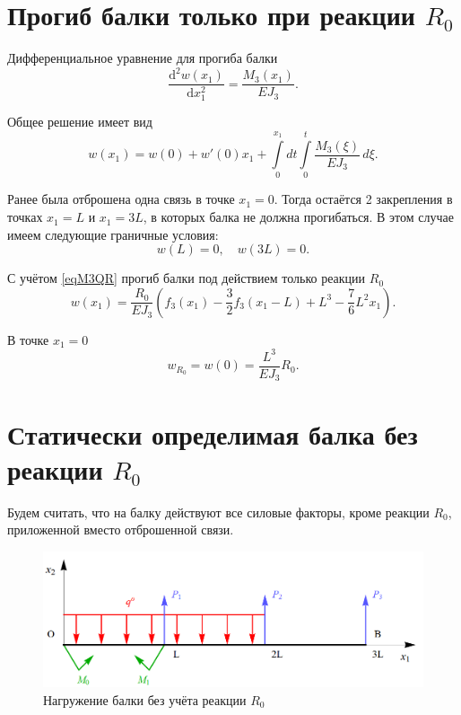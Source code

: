\documentclass[12pt, a4paper]{article}
\begin{document}
\section{Прогиб балки только при реакции $R_0$} 

Дифференциальное уравнение для прогиба балки
\[
\dfrac{\mathrm{d}^2 w(x_1)}{\mathrm{d} x_1^2} = \dfrac{M_3(x_1)}{E J_3}.
\]

Общее решение имеет вид
\vspace{-0.5em}
\begin{equation}
	w(x_1) = w(0) + w'(0) x_1 + \int\limits_0^{x_1} \! dt \int\limits_0^t \dfrac{M_3(\xi)}{E J_3} \, d \xi.
	\label{eqw}
\end{equation}

Ранее была отброшена одна связь в точке $x_1 = 0$. Тогда остаётся 2 закрепления в точках $x_1 = L$ и $x_1 = 3L$, в которых балка не должна прогибаться. В этом случае имеем следующие граничные условия:
\vspace{-0.5em}
\begin{equation}
	w(L) = 0, \quad w(3L) = 0.
	\label{eqwGU}
\end{equation}

\vspace{-0.5em}

С учётом \eqref{eqM3QR} прогиб балки под действием только реакции $R_0$
\begin{equation}
	w(x_1) = \dfrac{R_0}{E J_3} \left( f_3(x_1) - \dfrac{3}{2} f_3(x_1 - L) + L^3 - \dfrac{7}{6} L^2 x_1 \right).
	\label{eqwR}
\end{equation}

В точке $x_1 = 0$
\begin{equation}
	w_{R_0} = w(0) = \dfrac{L^3}{E J_3} R_0.
	\label{eqwR3}
\end{equation}

\newpage

\section{Статически определимая балка без реакции $R_0$} 

Будем считать, что на балку действуют все силовые факторы, кроме реакции $R_0$, приложенной вместо отброшенной связи.

\begin{figure}[!h]
	\centering
	\includegraphics[width=0.75\linewidth]{plot-7}
	\caption{Нагружение балки без учёта реакции $R_0$}
\end{figure}
\end{document}
